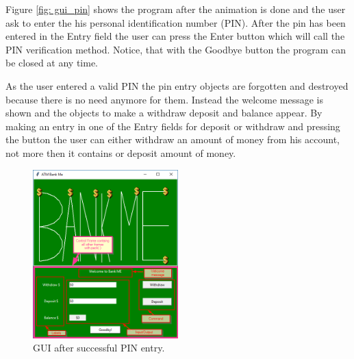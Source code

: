Figure \ref{fig: gui_pin} shows the program after the animation is done and the user ask to enter the his personal identification number (PIN). After the pin has been entered in the Entry field the user can press the Enter button which will call the PIN verification method. Notice, that with the Goodbye button the program can be closed at any time. 

As the user entered a valid PIN the pin entry objects are forgotten and destroyed because there is no need anymore for them. Instead the welcome message is shown and the objects to make a withdraw deposit and balance appear. By making an entry in one of the Entry fields for deposit or withdraw and pressing the button the user can either withdraw an amount of money from his account, not more then it contains or deposit amount of money.

\begin{figure}[H]
	\centering
	\includegraphics[width=0.5\textwidth]{01_images/gui.PNG}
	\caption{GUI after successful PIN entry.}
	\label{fig: gui}
\end{figure}


